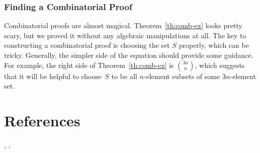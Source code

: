 \subsubsection{Finding a Combinatorial Proof}

Combinatorial proofs are almost magical.  Theorem~\ref{th:comb-ex}
looks pretty scary, but we proved it without any algebraic
manipulations at all.  The key to constructing a combinatorial proof
is choosing the set $S$ properly, which can be tricky.  Generally, the
simpler side of the equation should provide some guidance.  For
example, the right side of Theorem~\ref{th:comb-ex} is
$\binom{3n}{n}$, which suggests that it will be helpful to choose~$S$
to be all $n$-element subsets of some $3n$-element set.

\begin{problems}
\practiceproblems
{}

\classproblems
{}

\homeworkproblems
{}

\end{problems}

\section{References}

\cite{BenjaminQ2003},
\cite{MR2359513},
\cite{Even1973}

\endinput
